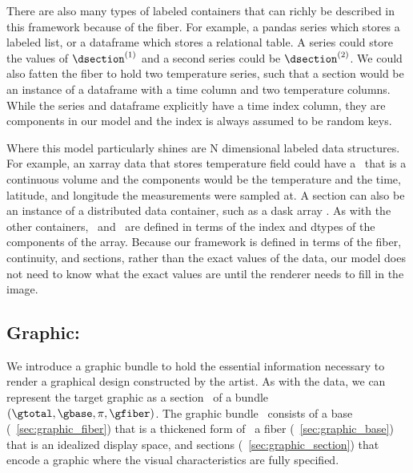 \documentclass[../main.tex]{subfiles}
\begin{document}
There are also many types of labeled containers that can richly be described in this framework because of the fiber. For example, a pandas series which stores a labeled list, or a dataframe\cite{jeff_reback_2020_3715232} which stores a relational table. A series could store the values of $\dsection^{(1)}$ and a second series could be  $\dsection^{(2)}$. We could also fatten the fiber to hold two temperature series, such that a section would be an instance of a dataframe with a time column and two temperature columns. While the series and dataframe explicitly have a time index column, they are components in our model and the index is always assumed to be random keys.

Where this model particularly shines are N dimensional labeled data structures. For example, an xarray\cite{hoyer2017xarray} data that stores temperature field could have a \dbase\ that is a continuous volume and the components would be the temperature and the time, latitude, and longitude the measurements were sampled at. A section can also be an instance of a distributed data container, such as a dask array \cite{rocklinDaskParallelComputation2015}. As with the other containers, \dbase\ and \dfiber\ are defined in terms of the index and dtypes of the components of the array. Because our framework is defined in terms of the fiber, continuity, and sections, rather than the exact values of the data, our model does not need to know what the exact values are until the renderer needs to fill in the image.  


\subsection{Graphic: \gtotal}
\label{sec:graphic}  
We introduce a graphic bundle to hold the essential information necessary to render a graphical design constructed by the artist. As with the data, we can represent the target graphic as a section \gsection\ of a bundle  $(\gtotal, \gbase, \pi, \gfiber)$. The graphic bundle \gtotal\ consists of a base \gbase (~\ref{sec:graphic_fiber}) that is a thickened form of \dbase\, 
a fiber \gfiber (~\ref{sec:graphic_base}) that is an idealized display space, and sections \gsection (~\ref{sec:graphic_section}) that encode a graphic where the visual characteristics are fully specified.
\end{document}
